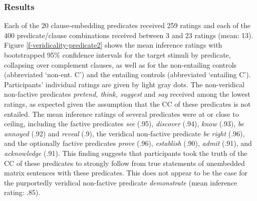 \documentclass[11pt,fleqn]{article}
\newcommand{\6}{\mbox{$[\hspace*{-.6mm}[$}}
\newcommand{\9}{\mbox{$]\hspace*{-.6mm}]$}}
\begin{document}
\subsubsection{Results}

Each of the 20 clause-embedding predicates received 259 ratings and each of the 400 predicate/clause combinations received between 3 and 23 ratings (mean: 13). Figure \ref{f-veridicality-predicate2} shows the mean inference ratings with bootstrapped 95\% confidence intervals for the target stimuli by predicate, collapsing over complement clauses, as well as for the non-entailing controls (abbreviated `non-ent. C') and the entailing controls (abbreviated `entailing C'). Participants' individual ratings are given by light gray dots. The non-veridical non-factive predicates {\em pretend, think, suggest} and {\em say} received among the lowest ratings, as expected given the assumption that the CC of these predicates is not entailed.  The mean inference ratings of several predicates were at or close to ceiling, including the factive predicates {\em see} (.95), {\em discover} (.94),  {\em know} (.93), {\em be annoyed} (.92) and {\em reveal} (.9), the veridical non-factive predicate {\em be right} (.96), and the optionally factive predicates {\em prove} (.96),  {\em establish} (.90), {\em admit} (.91), and {\em acknowledge} (.91). This finding suggests that participants took the truth of the CC of these predicates to strongly follow from true statements of unembedded matrix sentences with these predicates. This does not appear to be the case for the purportedly veridical non-factive predicate {\em demonstrate} (mean inference rating: .85).

\end{document}
